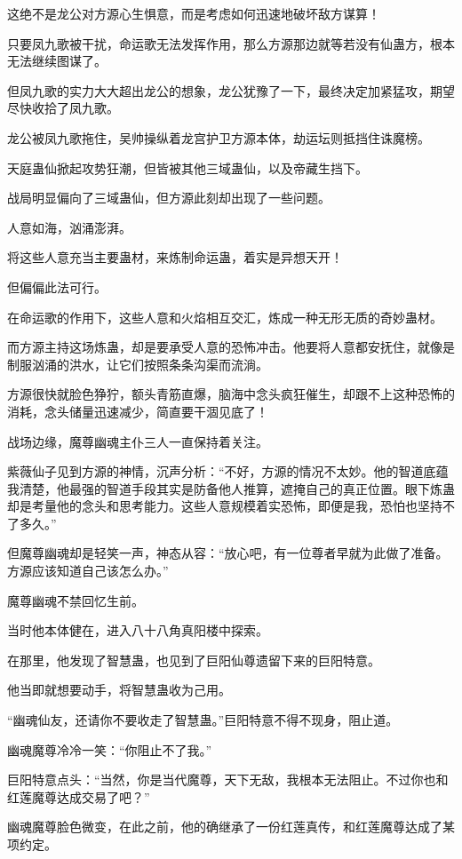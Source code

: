 \begin{this_body}
这绝不是龙公对方源心生惧意，而是考虑如何迅速地破坏敌方谋算！

只要凤九歌被干扰，命运歌无法发挥作用，那么方源那边就等若没有仙蛊方，根本无法继续图谋了。

但凤九歌的实力大大超出龙公的想象，龙公犹豫了一下，最终决定加紧猛攻，期望尽快收拾了凤九歌。

龙公被凤九歌拖住，吴帅操纵着龙宫护卫方源本体，劫运坛则抵挡住诛魔榜。

天庭蛊仙掀起攻势狂潮，但皆被其他三域蛊仙，以及帝藏生挡下。

战局明显偏向了三域蛊仙，但方源此刻却出现了一些问题。

人意如海，汹涌澎湃。

将这些人意充当主要蛊材，来炼制命运蛊，着实是异想天开！

但偏偏此法可行。

在命运歌的作用下，这些人意和火焰相互交汇，炼成一种无形无质的奇妙蛊材。

而方源主持这场炼蛊，却是要承受人意的恐怖冲击。他要将人意都安抚住，就像是制服汹涌的洪水，让它们按照条条沟渠而流淌。

方源很快就脸色狰狞，额头青筋直爆，脑海中念头疯狂催生，却跟不上这种恐怖的消耗，念头储量迅速减少，简直要干涸见底了！

战场边缘，魔尊幽魂主仆三人一直保持着关注。

紫薇仙子见到方源的神情，沉声分析：“不好，方源的情况不太妙。他的智道底蕴我清楚，他最强的智道手段其实是防备他人推算，遮掩自己的真正位置。眼下炼蛊却是考量他的念头和思考能力。这些人意规模着实恐怖，即便是我，恐怕也坚持不了多久。”

但魔尊幽魂却是轻笑一声，神态从容：“放心吧，有一位尊者早就为此做了准备。方源应该知道自己该怎么办。”

魔尊幽魂不禁回忆生前。

当时他本体健在，进入八十八角真阳楼中探索。

在那里，他发现了智慧蛊，也见到了巨阳仙尊遗留下来的巨阳特意。

他当即就想要动手，将智慧蛊收为己用。

“幽魂仙友，还请你不要收走了智慧蛊。”巨阳特意不得不现身，阻止道。

幽魂魔尊冷冷一笑：“你阻止不了我。”

巨阳特意点头：“当然，你是当代魔尊，天下无敌，我根本无法阻止。不过你也和红莲魔尊达成交易了吧？”

幽魂魔尊脸色微变，在此之前，他的确继承了一份红莲真传，和红莲魔尊达成了某项约定。


\end{this_body}
